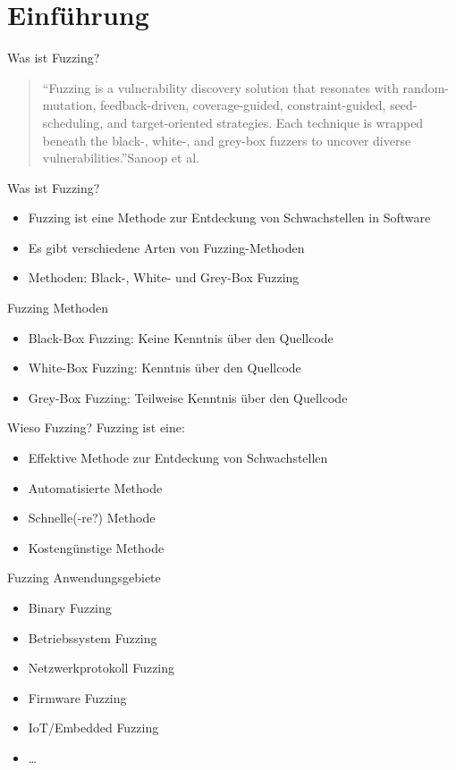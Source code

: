 
\section{Einführung}\label{sec:einfuhrung}
\begin{frame}{Was ist Fuzzing?}
    \blockquote{\enquote{Fuzzing is a vulnerability discovery solution that resonates with random-mutation, feedback-driven,
        coverage-guided, constraint-guided, seed-scheduling, and target-oriented strategies.
        Each technique is wrapped beneath the black-, white-, and grey-box fuzzers to uncover diverse vulnerabilities.}Sanoop et al.~\cite{fuzzing_methods}}
\end{frame}
\begin{frame}{Was ist Fuzzing?}
    \begin{itemize}
        \item Fuzzing ist eine Methode zur Entdeckung von Schwachstellen in Software
        \item Es gibt verschiedene Arten von Fuzzing-Methoden
        \item Methoden: Black-, White- und Grey-Box Fuzzing
    \end{itemize}
\end{frame}
\begin{frame}{Fuzzing Methoden}
    \begin{itemize}
        \item Black-Box Fuzzing: Keine Kenntnis über den Quellcode
        \item White-Box Fuzzing: Kenntnis über den Quellcode
        \item Grey-Box Fuzzing: Teilweise Kenntnis über den Quellcode
    \end{itemize}
\end{frame}
\begin{frame}{Wieso Fuzzing?}
    Fuzzing ist eine:
    \begin{itemize}
        \item Effektive Methode zur Entdeckung von Schwachstellen
        \item Automatisierte Methode
        \item Schnelle(-re?) Methode
        \item Kostengünstige Methode
    \end{itemize}
\end{frame}
\begin{frame}{Fuzzing Anwendungsgebiete}
    \begin{itemize}
        \item Binary Fuzzing
        \item Betriebssystem Fuzzing
        \item Netzwerkprotokoll Fuzzing
        \item Firmware Fuzzing
        \item IoT/Embedded Fuzzing
        \item \ldots
    \end{itemize}
\end{frame}
